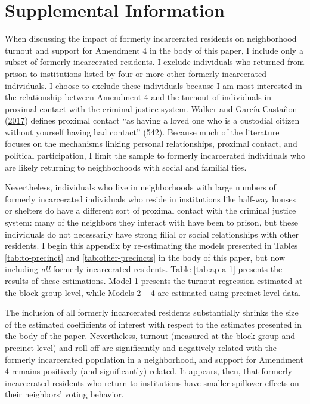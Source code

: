 \documentclass[
  12pt,
]{article}
\begin{document}
\newpage

\hypertarget{appendix-a}{%
\section*{Supplemental Information}\label{appendix-a}}

When discussing the impact of formerly incarcerated residents on neighborhood turnout and support for Amendment 4 in the body of this paper, I include only a subset of formerly incarcerated residents. I exclude individuals who returned from prison to institutions listed by four or more other formerly incarcerated individuals. I choose to exclude these individuals because I am most interested in the relationship between Amendment 4 and the turnout of individuals in proximal contact with the criminal justice system. Walker and García-Castañon (\protect\hyperlink{ref-Walker2017}{2017}) defines proximal contact ``as having a loved one who is a custodial citizen without yourself having had contact'' (542). Because much of the literature focuses on the mechanisms linking personal relationships, proximal contact, and political participation, I limit the sample to formerly incarcerated individuals who are likely returning to neighborhoods with social and familial ties.

Nevertheless, individuals who live in neighborhoods with large numbers of formerly incarcerated individuals who reside in institutions like half-way houses or shelters do have a different sort of proximal contact with the criminal justice system: many of the neighbors they interact with have been to prison, but these individuals do not necessarily have strong filial or social relationships with other residents. I begin this appendix by re-estimating the models presented in Tables \ref{tab:to-precinct} and \ref{tab:other-precincts} in the body of this paper, but now including \emph{all} formerly incarcerated residents. Table \ref{tab:ap-a-1} presents the results of these estimations. Model 1 presents the turnout regression estimated at the block group level, while Models 2 -- 4 are estimated using precinct level data.

\begin{singlespace}


\end{singlespace}

The inclusion of all formerly incarcerated residents substantially shrinks the size of the estimated coefficients of interest with respect to the estimates presented in the body of the paper. Nevertheless, turnout (measured at the block group and precinct level) and roll-off are significantly and negatively related with the formerly incarcerated population in a neighborhood, and support for Amendment 4 remains positively (and significantly) related. It appears, then, that formerly incarcerated residents who return to institutions have smaller spillover effects on their neighbors' voting behavior.
\end{document}
